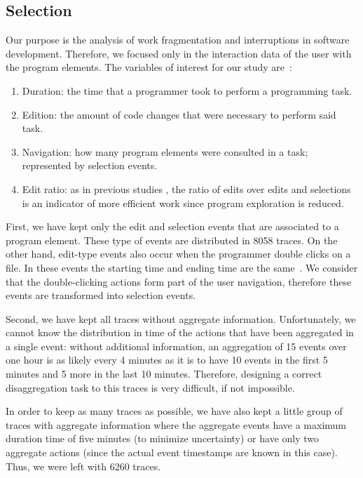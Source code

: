 \documentclass[times]{smrauth}
\begin{document}
\subsection{Selection}
Our purpose is the analysis of work fragmentation and interruptions in software development. Therefore, we focused only in the interaction data of the user with the program elements. The  variables of interest for our study are~\cite{RD13}:
\begin{enumerate}
\item Duration: the time that a programmer took to perform a programming task. 
\item Edition:  the amount of code changes that were necessary to perform said task. %
\item Navigation: how many program elements were consulted in a task; represented by selection events.
\item Edit ratio: as in previous studies \cite{KM06}, the ratio of edits over edits and selections is an indicator of more efficient work since program exploration is reduced.
\end{enumerate}

First, we have kept only the edit and selection events that are associated to a program element. These type of events are distributed in 8058 traces. On the other hand, edit-type events also occur when the programmer double clicks on a file. In these events the starting time and ending time are the same~\cite{LJD11}. We consider that the double-clicking actions form part of the user navigation, therefore these events are transformed into selection events.  

Second, we have kept all traces without aggregate information. Unfortunately, we cannot know the distribution in time of the actions that have been aggregated in a single event: without additional information, an aggregation of 15 events over one hour is as likely every 4 minutes as it is to have 10 events in the first 5 minutes and 5 more in the last 10 minutes. Therefore, designing a correct disaggregation task to this traces is very difficult, if not impossible.

In order to keep as many traces as possible, we have also kept a little group of traces with aggregate information where the aggregate events have a maximum duration time of five minutes (to minimize uncertainty) or have only two aggregate actions (since the actual event timestamps are known in this case). Thus, we were left with 6260 traces.
\end{document}
